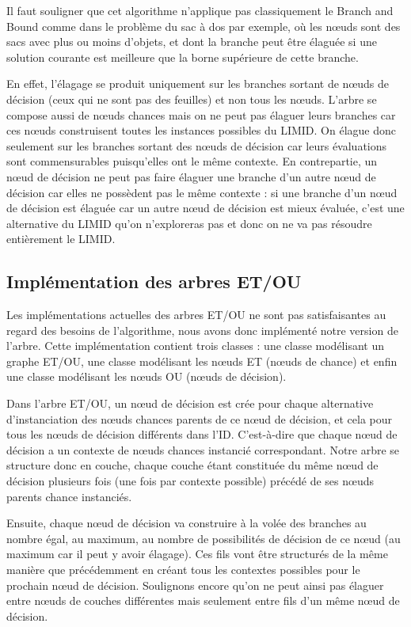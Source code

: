 \documentclass[12pt]{article}
\begin{document}
Il faut souligner que cet algorithme n'applique pas classiquement le Branch and Bound comme dans le problème du sac à dos par exemple, où les nœuds sont des sacs avec plus ou moins d'objets, et dont la branche peut être élaguée si une solution courante est meilleure que la borne supérieure de cette branche. 

En effet, l'élagage se produit uniquement sur les branches sortant de nœuds de décision (ceux qui ne sont pas des feuilles) et non tous les nœuds. L'arbre se compose  aussi de nœuds chances mais on ne peut pas élaguer leurs branches car ces nœuds construisent toutes les instances possibles du LIMID. On élague donc seulement sur les branches sortant des nœuds de décision car leurs évaluations sont commensurables puisqu'elles ont le même contexte. En contrepartie, un nœud de décision ne peut pas faire élaguer une branche d'un autre nœud de décision car elles ne possèdent pas le même contexte : si une branche d'un nœud de décision est élaguée car un autre nœud de décision est mieux évaluée, c'est une alternative du LIMID qu'on n'exploreras pas et donc on ne va pas résoudre entièrement le LIMID.


\subsection{Implémentation des arbres ET/OU}
Les implémentations actuelles des arbres ET/OU ne sont pas satisfaisantes au regard des besoins de l'algorithme, nous avons donc implémenté notre version de l'arbre. Cette implémentation contient trois classes : une classe modélisant un graphe ET/OU, une classe modélisant les nœuds ET (nœuds de chance) et enfin une classe modélisant les nœuds OU (nœuds de décision).

Dans l'arbre ET/OU, un nœud de décision est crée pour chaque alternative d'instanciation des nœuds chances parents de ce nœud de décision, et cela pour tous les nœuds de décision différents dans l'ID. C'est-à-dire que chaque nœud de décision a un contexte de nœuds chances instancié correspondant. Notre arbre se structure donc en couche, chaque couche étant constituée du même nœud de décision plusieurs fois (une fois par contexte possible) précédé de ses nœuds parents chance instanciés. 

Ensuite, chaque nœud de décision va construire à la volée des branches au nombre égal, au maximum, au nombre de possibilités de décision de ce nœud (au maximum car il peut y avoir élagage). Ces fils vont être structurés de la même manière que précédemment en créant tous les contextes possibles pour le prochain nœud de décision. Soulignons encore qu'on ne peut ainsi pas élaguer entre nœuds de couches différentes mais seulement entre fils d'un même nœud de décision.
\end{document}
